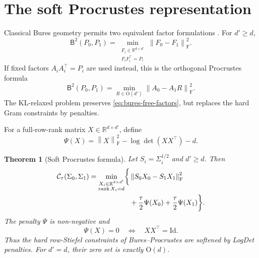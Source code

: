 \documentclass[11pt]{article}
\newtheorem{theorem}{Theorem}[section]
\theoremstyle{definition}
\theoremstyle{remark}
\newcommand{\R}{\mathbb R}
\newcommand{\Id}{\mathrm{Id}}
\newcommand{\BW}{\mathsf B}
\newcommand{\norm}[1]{\left\lVert #1\right\rVert}
\begin{document}
\section{The soft Procrustes representation}

Classical Bures geometry permits two equivalent factor formulations
\citep{BhatiaJainLim2019,MasarottoPanaretosZemel2019}. For $d'\geq d$,
\begin{equation}\label{eq:bures-free-factors}
 \BW^2(P_0,P_1)
 =\min_{\substack{F_i\in\R^{d\times d'}\\F_iF_i^\top=P_i}}
 \norm{F_0-F_1}_{\mathrm F}^2.
\end{equation}
If fixed factors $A_iA_i^\top=P_i$ are used instead, this is the orthogonal
Procrustes formula
\begin{equation}\label{eq:bures-hard-procrustes}
 \BW^2(P_0,P_1)
 =\min_{R\in\mathrm O(d')}\norm{A_0-A_1R}_{\mathrm F}^2.
\end{equation}
The KL-relaxed problem preserves \eqref{eq:bures-free-factors}, but replaces
the hard Gram constraints by penalties.

For a full-row-rank matrix $X\in\R^{d\times d'}$, define
\begin{equation}\label{eq:soft-stiefel-penalty}
 \Psi(X)
 =\norm{X}_{\mathrm F}^2-\log\det(XX^\top)-d.
\end{equation}

\begin{theorem}[Soft Procrustes formula]\label{thm:soft-procrustes}
Let $S_i=\Sigma_i^{1/2}$ and $d'\geq d$. Then
\begin{align}
 \mathcal C_\tau(\Sigma_0,\Sigma_1)
 =\min_{\substack{X_i\in\R^{d\times d'}\\
                   \operatorname{rank}X_i=d}}
 \biggl\{&
   \norm{S_0X_0-S_1X_1}_{\mathrm F}^2\notag\\
 &+\frac\tau2\Psi(X_0)+\frac\tau2\Psi(X_1)
 \biggr\}.
 \label{eq:soft-procrustes}
\end{align}
The penalty $\Psi$ is non-negative and
\begin{equation}\label{eq:soft-stiefel-zero-set}
 \Psi(X)=0\quad\Longleftrightarrow\quad XX^\top=\Id.
\end{equation}
Thus the hard row-Stiefel constraints of Bures--Procrustes are softened by
LogDet penalties. For $d'=d$, their zero set is exactly $\mathrm O(d)$.
\end{theorem}
\end{document}
